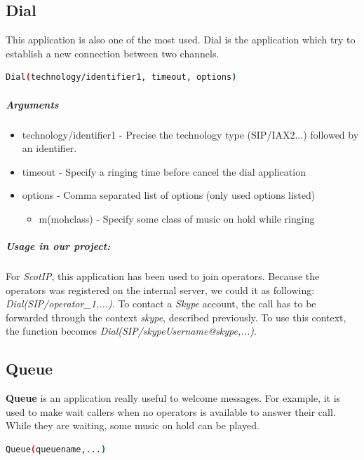 \subsection{Dial}
This application is also one of the most used. Dial is the application which try to establish a new connection between two channels. 



\begin{lstlisting}[language=bash,caption={Syntax of application Dial}]
Dial(technology/identifier1, timeout, options)
\end{lstlisting}

\subparagraph{Arguments}
\begin{itemize}

	\item technology/identifier1 - Precise the technology type (SIP/IAX2...) followed by an identifier. 
	\item timeout - Specify a ringing time before cancel the dial application
	\item options - Comma separated list of options (only used options listed)
	\begin{itemize}
		\item m(mohclass) - Specify some class of music on hold while ringing
	\end{itemize}
	
\end{itemize}

\subparagraph{Usage in our project:}
For \textit{ScotIP}, this application has been used to join operators. Because the operators was registered on the internal server, we could it as following: \textit{Dial(SIP/operator\_1,...)}. To contact a \textit{Skype} account, the call has to be forwarded through the context \textit{skype}, described previously. To use this context, the function becomes \textit{Dial(SIP/skypeUsername@skype,...)}.





\subsection{Queue}
\textbf{Queue} is an application really useful to welcome messages. For example, it is used to make wait callers when no operators is available to answer their call. While they are waiting, some music on hold can be played. 


\begin{lstlisting}[language=bash,caption={Syntax of application Playback}]
Queue(queuename,...)
\end{lstlisting}

